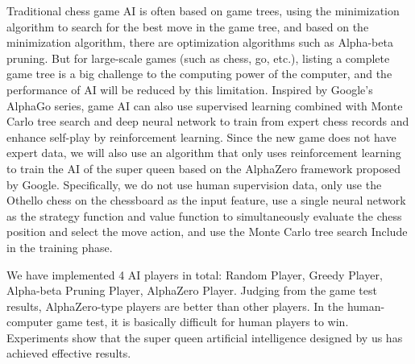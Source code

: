 Traditional chess game AI is often based on game trees, using the minimization algorithm to search for the best move in the game tree, and based on the minimization algorithm, there are optimization algorithms such as Alpha-beta pruning. But for large-scale games (such as chess, go, etc.), listing a complete game tree is a big challenge to the computing power of the computer, and the performance of AI will be reduced by this limitation. Inspired by Google's AlphaGo series, game AI can also use supervised learning combined with Monte Carlo tree search and deep neural network to train from expert chess records and enhance self-play by reinforcement learning.
Since the new game does not have expert data, we will also use an algorithm that only uses reinforcement learning to train the AI ​​of the super queen based on the AlphaZero framework proposed by Google. Specifically, we do not use human supervision data, only use the Othello chess on the chessboard as the input feature, use a single neural network as the strategy function and value function to simultaneously evaluate the chess position and select the move action, and use the Monte Carlo tree search Include in the training phase.


We have implemented 4 AI players in total: Random Player, Greedy Player, Alpha-beta Pruning Player, AlphaZero Player. Judging from the game test results, AlphaZero-type players are better than other players. In the human-computer game test, it is basically difficult for human players to win. Experiments show that the super queen artificial intelligence designed by us has achieved effective results.
